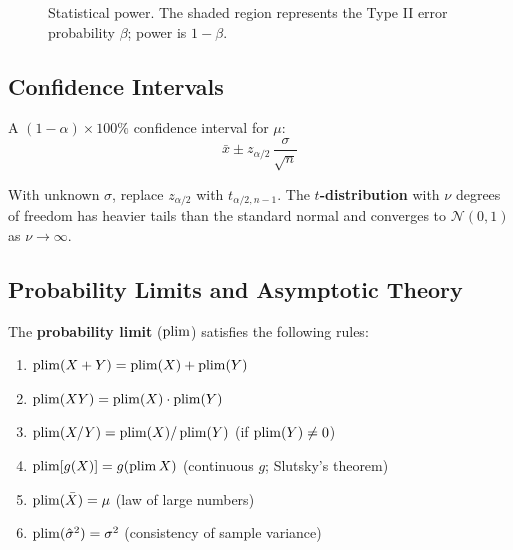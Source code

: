 \begin{figure}[htp]
\centering
{}
\caption{Statistical power. The shaded region represents the Type II error
probability $\beta$; power is $1-\beta$.}
\label{fig_Power}
\end{figure}

\subsection{Confidence Intervals}

A $(1-\alpha)\times100\%$ confidence interval for $\mu$:
\begin{equation}
  \bar{x} \pm z_{\alpha/2}\,\frac{\sigma}{\sqrt{n}}
\end{equation}

With unknown $\sigma$, replace $z_{\alpha/2}$ with $t_{\alpha/2, n-1}$.
The \textbf{$t$-distribution} with $\nu$ degrees of
freedom has heavier tails than the standard normal and converges to
$\mathcal{N}(0,1)$ as $\nu \to \infty$.

\subsection{Probability Limits and Asymptotic Theory}

The \textbf{probability limit} ($\operatorname{plim}$) satisfies
the following rules:

\begin{enumerate}[label=(\roman*)]
  \item $\operatorname{plim}(X + Y) = \operatorname{plim}(X) + \operatorname{plim}(Y)$
  \item $\operatorname{plim}(XY) = \operatorname{plim}(X)\cdot\operatorname{plim}(Y)$
  \item $\operatorname{plim}(X/Y) = \operatorname{plim}(X)/\operatorname{plim}(Y)$ \;(if $\operatorname{plim}(Y) \neq 0$)
  \item $\operatorname{plim}[g(X)] = g(\operatorname{plim} X)$ \;(continuous $g$; Slutsky's theorem)
  \item $\operatorname{plim}(\bar{X}) = \mu$ \;(law of large numbers)
  \item $\operatorname{plim}(\hat{\sigma}^2) = \sigma^2$ \;(consistency of sample variance)
\end{enumerate}



